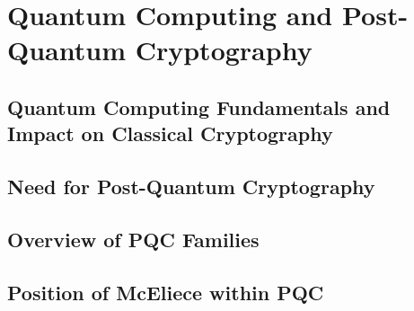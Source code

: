 \section{Quantum Computing and Post-Quantum Cryptography}
\label{chap:qcAndPqc}

\subsection{Quantum Computing Fundamentals and Impact on Classical Cryptography}
\label{sec:qcFundamentals}

\subsection{Need for Post-Quantum Cryptography}
\label{sec:needForPqc}

\subsection{Overview of PQC Families}
\label{sec:pqcFamilies}

\subsection{Position of McEliece within PQC}
\label{sec:mcelieceInPqc}
